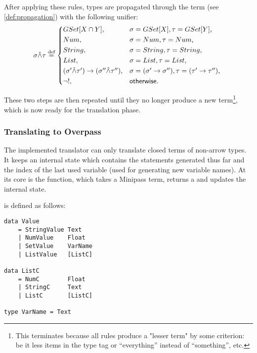 \documentclass[main.tex]{subfiles}
\begin{document}
After applying these rules, types are propagated through the term
(see \cref{def:propagation}) with the following unifier:
\[
    \sigma \unify \tau \defeq
    \begin{cases*}
        GSet[X \cap Y] ,& $\sigma = GSet[X], \tau = GSet[Y]$, \\
        Num ,& $\sigma = Num, \tau = Num$, \\
        String ,& $\sigma = String, \tau = String$, \\
        List ,& $\sigma = List, \tau = List$, \\
        (\sigma' \unify \tau') \tot (\sigma'' \unify \tau''), &
        $\sigma = (\sigma' \tot \sigma''), \tau = (\tau' \tot \tau'')$, \\
        \lnot ! ,& $\mathsf{otherwise}$. \\
    \end{cases*}
\]

These two steps are then repeated until they no longer produce a new term\footnote{
    This terminates because all rules produce a "lesser term" by some criterion:
    be it less items in the type tag or ``everything'' instead of ``something'', etc.
}, which is now ready for the translation phase.


\subsubsection{Translating to Overpass}\label{sec:translation}
The implemented translator can only translate closed terms of non-arrow types.
It keeps an internal state which contains the statements generated thus far
and the index of the last used variable (used for generating new variable
names).
At its core is the  function, which takes a Minipass term,
returns a  and updates the internal state.

 is defined as follows:
\begin{lstwrap}\begin{lstlisting}
data Value
    = StringValue Text
    | NumValue    Float
    | SetValue    VarName
    | ListValue   [ListC]

data ListC
    = NumC        Float
    | StringC     Text
    | ListC       [ListC]

type VarName = Text
\end{lstlisting}\end{lstwrap}
\end{document}
